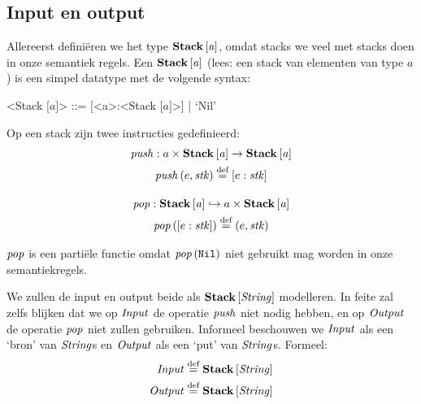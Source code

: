 \subsection{Input en output}
\label{sec:def:io}

Allereerst definiëren we het type $\mathbf{Stack}\left[\mathit{a}\right]$, omdat stacks we veel met stacks
doen in onze semantiek regels. Een $\mathbf{Stack}\left[\mathit{a}\right]$ (lees: een stack van elementen
van type $a$) is een simpel datatype met de volgende syntax:

\def\inbrackets#1{$\mathrm{[}#1\mathrm{]}$}
\def\bracka{\inbrackets{a}}
\begin{grammar}
	<Stack \bracka> ::= [<a>:<Stack \bracka>] | `Nil'
\end{grammar}

Op een stack zijn twee instructies gedefinieerd:
\begin{gather*}
	\mathit{push} : a \times \mathbf{Stack}\left[\mathit{a}\right] \to \mathbf{Stack}\left[\mathit{a}\right] \\
	\mathit{push}\left(e, \mathit{stk}\right) \stackrel{\text{def}}{=} [e:\mathit{stk}] \\[1em]
	\mathit{pop} : \mathbf{Stack}\left[\mathit{a}\right] \hookrightarrow a \times \mathbf{Stack}\left[\mathit{a}\right] \\
	\mathit{pop}\left([e:\mathit{stk}]\right) \stackrel{\text{def}}{=} (e,\mathit{stk}) \\
\end{gather*}

$\mathit{pop}$ is een partiële functie omdat $\mathit{pop}\left(\texttt{Nil}\right)$ niet gebruikt mag worden in
onze semantiekregels. %

\medskip
We zullen de input en output beide als $\mathbf{Stack}\left[\mathit{\mathit{String}}\right]$ modelleren. In feite
zal zelfs blijken dat we op $\mathit{Input}$ de operatie $\mathit{push}$ niet nodig hebben,
en op $\mathit{Output}$ de operatie $\mathit{pop}$ niet zullen gebruiken. Informeel
beschouwen we $\mathit{Input}$ als een `bron' van $\mathit{String}$s en $\mathit{Output}$ als een `put'
van $\mathit{String}$s. Formeel:
\begin{align*}
	\mathit{Input} &\stackrel{\text{def}}{=} \mathbf{Stack}\left[\mathit{\mathit{String}}\right] \\ \mathit{Output} &\stackrel{\text{def}}{=} \mathbf{Stack}\left[\mathit{\mathit{String}}\right]
\end{align*}

